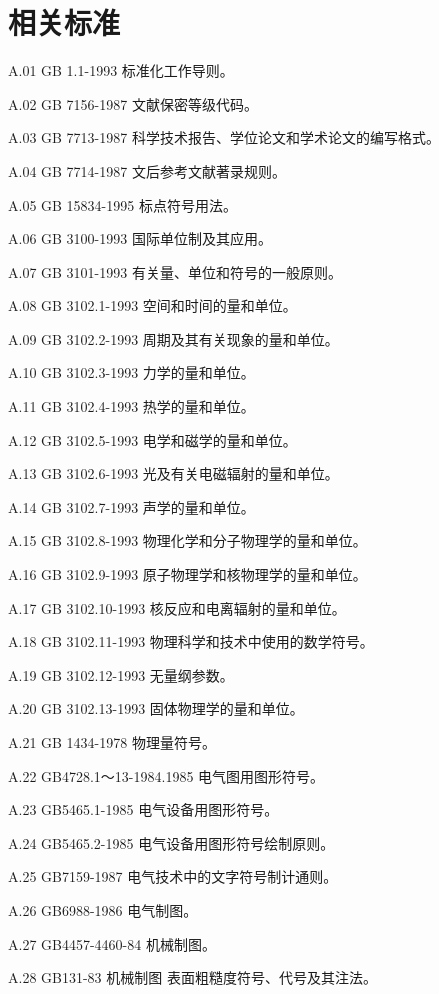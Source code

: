 \chapter{相关标准}%

A.01 GB 1.1-1993 标准化工作导则。

A.02 GB 7156-1987 文献保密等级代码。

A.03 GB 7713-1987 科学技术报告、学位论文和学术论文的编写格式。

A.04 GB 7714-1987 文后参考文献著录规则。

A.05 GB 15834-1995 标点符号用法。

A.06 GB 3100-1993 国际单位制及其应用。

A.07 GB 3101-1993 有关量、单位和符号的一般原则。

A.08 GB 3102.1-1993 空间和时间的量和单位。

A.09 GB 3102.2-1993 周期及其有关现象的量和单位。

A.10 GB 3102.3-1993 力学的量和单位。

A.11 GB 3102.4-1993 热学的量和单位。

A.12 GB 3102.5-1993 电学和磁学的量和单位。

A.13 GB 3102.6-1993 光及有关电磁辐射的量和单位。

A.14 GB 3102.7-1993 声学的量和单位。

A.15 GB 3102.8-1993 物理化学和分子物理学的量和单位。

A.16 GB 3102.9-1993 原子物理学和核物理学的量和单位。

A.17 GB 3102.10-1993 核反应和电离辐射的量和单位。

A.18 GB 3102.11-1993 物理科学和技术中使用的数学符号。

A.19 GB 3102.12-1993 无量纲参数。

A.20 GB 3102.13-1993 固体物理学的量和单位。

A.21 GB 1434-1978 物理量符号。

A.22 GB4728.1～13-1984.1985 电气图用图形符号。

A.23 GB5465.1-1985 电气设备用图形符号。

A.24 GB5465.2-1985 电气设备用图形符号绘制原则。

A.25 GB7159-1987 电气技术中的文字符号制计通则。

A.26 GB6988-1986 电气制图。

A.27 GB4457-4460-84 机械制图。

A.28 GB131-83 机械制图 表面粗糙度符号、代号及其注法。



